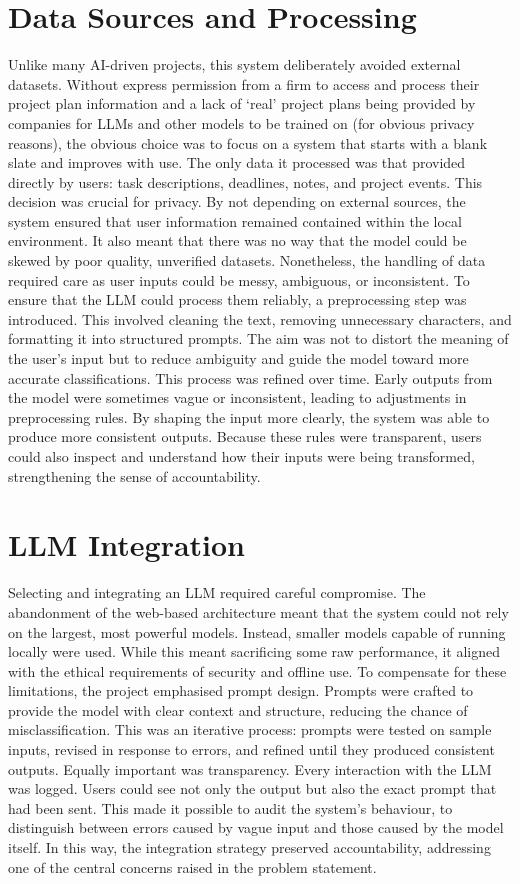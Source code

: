 \documentclass{report}
\begin{document}
\section{Data Sources and Processing}

Unlike many AI-driven projects, this system deliberately avoided external datasets. 
Without express permission from a firm to access and process their project plan information and a lack of `real' project plans being provided by companies for LLMs and other models to be trained on (for obvious privacy reasons), the obvious choice was to focus on a system that starts with a blank slate and improves with use.
The only data it processed was that provided directly by users: task descriptions, deadlines, notes, and project events. 
This decision was crucial for privacy. 
By not depending on external sources, the system ensured that user information remained contained within the local environment.
It also meant that there was no way that the model could be skewed by poor quality, unverified datasets. 
Nonetheless, the handling of data required care as user inputs could be messy, ambiguous, or inconsistent. 
To ensure that the LLM could process them reliably, a preprocessing step was introduced. 
This involved cleaning the text, removing unnecessary characters, and formatting it into structured prompts. 
The aim was not to distort the meaning of the user's input but to reduce ambiguity and guide the model toward more accurate classifications.
This process was refined over time. Early outputs from the model were sometimes vague or inconsistent, leading to adjustments in preprocessing rules. 
By shaping the input more clearly, the system was able to produce more consistent outputs. 
Because these rules were transparent, users could also inspect and understand how their inputs were being transformed, strengthening the sense of accountability.

\section{LLM Integration}

Selecting and integrating an LLM required careful compromise. 
The abandonment of the web-based architecture meant that the system could not rely on the largest, most powerful models. 
Instead, smaller models capable of running locally were used. 
While this meant sacrificing some raw performance, it aligned with the ethical requirements of security and offline use.
To compensate for these limitations, the project emphasised prompt design. 
Prompts were crafted to provide the model with clear context and structure, reducing the chance of misclassification. 
This was an iterative process: prompts were tested on sample inputs, revised in response to errors, and refined until they produced consistent outputs.
Equally important was transparency. Every interaction with the LLM was logged. Users could see not only the output but also the exact prompt that had been sent. 
This made it possible to audit the system's behaviour, to distinguish between errors caused by vague input and those caused by the model itself. 
In this way, the integration strategy preserved accountability, addressing one of the central concerns raised in the problem statement.
\end{document}

